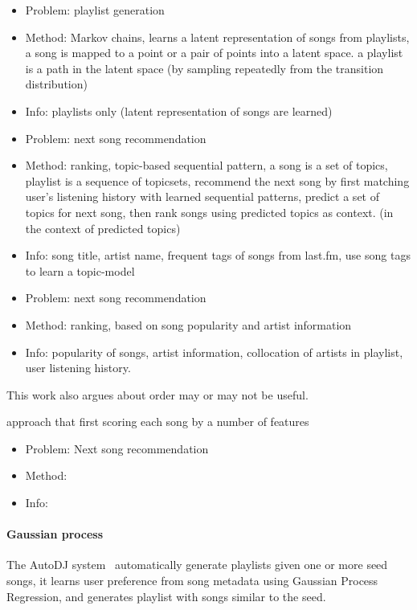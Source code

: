 \cite{chen2012playlist}
\begin{itemize}
\item Problem: playlist generation
\item Method: Markov chains, learns a latent representation of songs from playlists, a song is mapped to a point or a pair of points into a latent space.
a playlist is a path in the latent space (by sampling repeatedly from the transition distribution)
\item Info: playlists only (latent representation of songs are learned)
\end{itemize}


\cite{hariri2012context}
\begin{itemize}
\item Problem: next song recommendation 
\item Method: ranking, topic-based sequential pattern, a song is a set of topics, playlist is a sequence of topicsets, recommend the next song by first matching user's listening history with learned sequential patterns, predict a set of topics for next song, then rank songs using predicted topics as context. (in the context of predicted topics)
\item Info: song title, artist name, frequent tags of songs from last.fm, use song tags to learn a topic-model
\end{itemize}



\cite{bonnin2013evaluating}
\begin{itemize}
\item Problem: next song recommendation 
\item Method: ranking, based on song popularity and artist information
\item Info: popularity of songs, artist information, collocation of artists in playlist, user listening history.
\end{itemize}
This work also argues about order may or may not be useful.


\cite{jannach2015beyond} approach that first scoring each song by a number of features
\begin{itemize}
\item Problem: Next song recommendation
\item Method:
\item Info:
\end{itemize}




\paragraph{Gaussian process}
The AutoDJ system~\cite{platt2002learning} automatically generate playlists given one or more seed songs, 
it learns user preference from song metadata using Gaussian Process Regression,
and generates playlist with songs similar to the seed.


